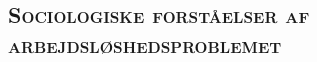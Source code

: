 





















\newpage \subsection{\textsc{Sociologiske forståelser af arbejdsløshedsproblemet}}

